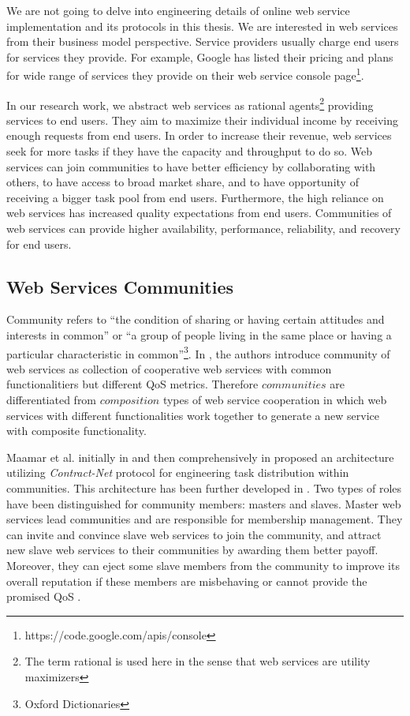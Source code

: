 We are not going to delve into engineering details of online web
service implementation and its protocols in this thesis. We are
interested in web services from their business model perspective.
Service providers usually charge end users for services they
provide. For example, Google has listed their pricing and plans
for wide range of services they provide on their web service
console page\footnote{https://code.google.com/apis/console}.

In our research work, we abstract web services as rational
agents\footnote{The term
        rational is used here in the sense that web services are utility
        maximizers} providing services to end users. They aim to maximize
        their individual income by receiving enough requests from end
        users. In order to increase their revenue, web services seek for
        more tasks if they have the capacity and throughput to do so. Web
        services can join communities to have better efficiency by
        collaborating with others, to have access to broad market share,
        and to have opportunity of receiving a bigger task pool from end
        users. Furthermore, the high reliance on web services has increased quality expectations from end users.
        Communities of web services can provide higher availability, performance, reliability, and recovery for end users.

\subsection{Web Services Communities}\label{sec:CWSDefinition}
Community refers to ``the condition of sharing or having certain
attitudes and interests in common'' or ``a group of people living
in the same place or having a particular characteristic in
common''\footnote{Oxford Dictionaries}. In
\cite{DBLP:journals/internet/BenatallahSD03,
Zeng:2003:QDW:775152.775211}, the authors introduce community of
web services as collection of cooperative web services with common
functionalitiers but different QoS metrics. Therefore
$communities$ are differentiated from $composition$ types of web
service cooperation in which web services with different
functionalities work together to generate a new service with
composite functionality.


Maamar et al. initially in \cite{conf/webist/MaamarLBTS07} and
then comprehensively in \cite{DBLP:journals/ijebr/MaamarSTBB09}
proposed an architecture utilizing \emph{Contract-Net} protocol
for engineering task distribution within communities. This
architecture has been further developed in
\cite{conf/IEEEscc/BenharrefSBB11, conf/IEEEscc/KhosravifarBMMT10,
conf/aina/LimTM11, CSTintercommunity}. Two types of roles have
been distinguished for community members: masters and slaves.
Master web services lead communities and are responsible for
membership management. They can invite and convince slave web
services to join the community, and attract new slave web services
to their communities by awarding them better payoff. Moreover,
they can eject some slave members from the community to improve
its overall reputation if these members are misbehaving or cannot
provide the promised QoS \cite{DBLP:journals/ijebr/MaamarSTBB09}.

